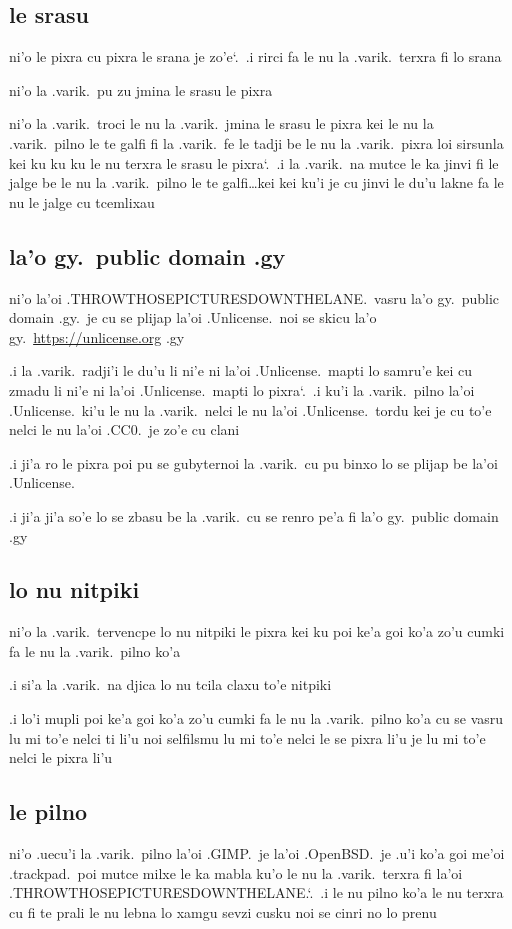 \documentclass{report}
\newcommand\sds{\spacefactor\sfcode`.\ \space}
\begin{document}
\subsection{le srasu}
ni'o le pixra cu pixra le srana je zo'e\sds  .i rirci fa le nu la .varik.\ terxra fi lo srana

ni'o la .varik.\ pu zu jmina le srasu le pixra

ni'o la .varik.\ troci le nu la .varik.\ jmina le srasu le pixra kei le nu la .varik.\ pilno le te galfi fi la .varik.\ fe le tadji be le nu la .varik.\ pixra loi sirsunla kei ku ku ku le nu terxra le srasu le pixra\sds  .i la .varik.\ na mutce le ka jinvi fi le jalge be le nu la .varik.\ pilno le te galfi\ldots kei kei ku'i je cu jinvi le du'u lakne fa le nu le jalge cu tcemlixau

\subsection{la'o gy.\ public domain .gy}
ni'o la'oi .THROWTHOSEPICTURESDOWNTHELANE.\ vasru la'o gy.\ public domain .gy.\ je cu se plijap la'oi .Unlicense.\ noi se skicu la'o gy.\ \url{https://unlicense.org} .gy

.i la .varik.\ radji'i le du'u li ni'e ni la'oi .Unlicense.\ mapti lo samru'e kei cu zmadu li ni'e ni la'oi .Unlicense.\ mapti lo pixra\sds  .i ku'i la .varik.\ pilno la'oi .Unlicense.\ ki'u le nu la .varik.\ nelci le nu la'oi .Unlicense.\ tordu kei je cu to'e nelci le nu la'oi .CC0.\ je zo'e cu clani

.i ji'a ro le pixra poi pu se gubyternoi la .varik.\ cu pu binxo lo se plijap be la'oi .Unlicense.

.i ji'a ji'a so'e lo se zbasu be la .varik.\ cu se renro pe'a fi la'o gy.\ public domain .gy

\subsection{lo nu nitpiki}
ni'o la .varik.\ tervencpe lo nu nitpiki le pixra kei ku poi ke'a goi ko'a zo'u cumki fa le nu la .varik.\ pilno ko'a

.i si'a la .varik.\ na djica lo nu tcila claxu to'e nitpiki

.i lo'i mupli poi ke'a goi ko'a zo'u cumki fa le nu la .varik.\ pilno ko'a cu se vasru lu mi to'e nelci ti li'u noi selfilsmu lu mi to'e nelci le se pixra li'u je lu mi to'e nelci le pixra li'u

\subsection{le pilno}
ni'o .uecu'i la .varik.\ pilno la'oi .GIMP.\ je la'oi .OpenBSD.\ je .u'i ko'a goi me'oi .trackpad.\ poi mutce milxe le ka mabla ku'o le nu la .varik.\ terxra fi la'oi .THROWTHOSEPICTURESDOWNTHELANE.\sds  .i le nu pilno ko'a le nu terxra cu fi te prali le nu lebna lo xamgu sevzi cusku noi se cinri no lo prenu
\end{document}
